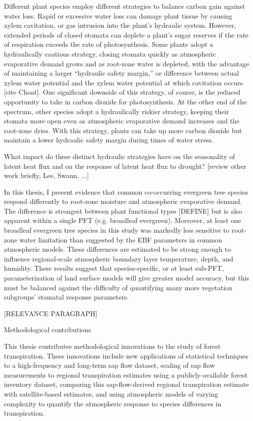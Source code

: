 Different plant species employ different strategies to balance carbon gain against water loss.  Rapid or excessive water loss can damage plant tissue by causing xylem cavitation, or gas intrusion into the plant's hydraulic system.  However, extended periods of closed stomata can deplete a plant's sugar reserves if the rate of respiration exceeds the rate of photosynthesis.  Some plants adopt a hydraulically cautious strategy, closing stomata quickly as atmospheric evaporative demand grows and as root-zone water is depleted, with the advantage of maintaining a larger ``hydraulic safety margin,'' or difference between actual xylem water potential and the xylem water potential at which cavitation occurs [cite Choat]. One significant downside of this strategy, of course, is the reduced opportunity to take in carbon dioxide for photosynthesis.  At the other end of the spectrum, other species adopt a hydraulically riskier strategy, keeping their stomata more open even as atmospheric evaporative demand increases and the root-zone dries.  With this strategy, plants can take up more carbon dioxide but maintain a lower hydraulic safety margin during times of water stress.

What impact do these distinct hydraulic strategies have on the seasonality of latent heat flux and on the response of latent heat flux to drought? [review other work briefly, Lee, Swann, ...]

In this thesis, I present evidence that common co-occurring evergreen tree species respond differently to root-zone moisture and atmospheric evaporative demand.  The difference is strongest between plant functional types [DEFINE] but is also apparent within a single PFT (e.g. broadleaf evergreen).  Moreover, at least one broadleaf evergreen tree species in this study was markedly less sensitive to root-zone water limitation than suggested by the EBF parameters in common atmospheric models.  These differences are estimated to be strong enough to influence regional-scale atmospheric boundary layer temperature, depth, and humidity.  These results suggest that species-specific, or at least sub-PFT, parameterization of land surface models will give greater model accuracy, but this must be balanced against the difficulty of quantifying many more vegetation subgroups' stomatal response parameters.

[RELEVANCE PARAGRAPH]

Methodological contributions

This thesis contributes methodological innovations to the study of forest transpiration.  These innovations include new applications of statistical techniques to a high-frequency and long-term sap flow dataset, scaling of sap flow measurements to regional transpiration estimates using a publicly-available forest inventory dataset, comparing this sap-flow-derived regional transpiration estimate with satellite-based estimates, and using atmospheric models of varying complexity to quantify the atmospheric response to species differences in transpiration.

